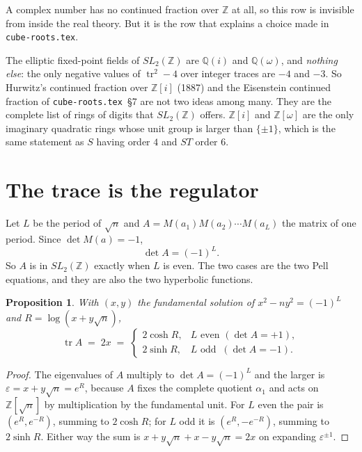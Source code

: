 \documentclass[12pt,a4paper]{article}
\theoremstyle{plain}
\newtheorem{proposition}[theorem]{Proposition}
\theoremstyle{definition}
\newcommand{\tr}{\operatorname{tr}}
\begin{document}
A complex number has no continued fraction over $\mathbb{Z}$ at all, so this row is invisible from inside the real theory. But it is the row that explains a choice made in \texttt{cube-roots.tex}.

\begin{tcolorbox}[colback=green!5, colframe=green!40!black, arc=2mm]
The elliptic fixed-point fields of $SL_2(\mathbb{Z})$ are $\mathbb{Q}(i)$ and $\mathbb{Q}(\omega)$, and \emph{nothing else}: the only negative values of $\tr^2-4$ over integer traces are $-4$ and $-3$. So Hurwitz's continued fraction over $\mathbb{Z}[i]$ (1887) and the Eisenstein continued fraction of \texttt{cube-roots.tex}~\S7 are not two ideas among many. They are the complete list of rings of digits that $SL_2(\mathbb{Z})$ offers. $\mathbb{Z}[i]$ and $\mathbb{Z}[\omega]$ are the only imaginary quadratic rings whose unit group is larger than $\{\pm1\}$, which is the same statement as $S$ having order $4$ and $ST$ order $6$.
\end{tcolorbox}

\section{The trace is the regulator}

Let $L$ be the period of $\sqrt n$ and $A = M(a_1)M(a_2)\cdots M(a_L)$ the matrix of one period. Since $\det M(a) = -1$,
\[
  \det A = (-1)^L .
\]
So $A$ is in $SL_2(\mathbb{Z})$ exactly when $L$ is even. The two cases are the two Pell equations, and they are also the two hyperbolic functions.

\begin{proposition}\label{trace}
With $(x,y)$ the fundamental solution of $x^2 - ny^2 = (-1)^L$ and $R = \log(x+y\sqrt n)$,
\[
  \tr A \;=\; 2x \;=\;
  \begin{cases}
    2\cosh R, & L \text{ even } (\det A = +1),\\[2pt]
    2\sinh R, & L \text{ odd } \ (\det A = -1).
  \end{cases}
\]
\end{proposition}

\begin{proof}
The eigenvalues of $A$ multiply to $\det A = (-1)^L$ and the larger is $\varepsilon = x+y\sqrt n = e^R$, because $A$ fixes the complete quotient $\alpha_1$ and acts on $\mathbb{Z}[\sqrt n]$ by multiplication by the fundamental unit. For $L$ even the pair is $(e^R, e^{-R})$, summing to $2\cosh R$; for $L$ odd it is $(e^R, -e^{-R})$, summing to $2\sinh R$. Either way the sum is $x+y\sqrt n + x - y\sqrt n = 2x$ on expanding $\varepsilon^{\pm1}$.
\end{proof}
\end{document}
